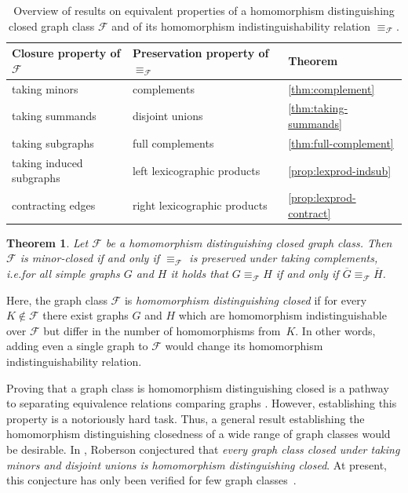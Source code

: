 \documentclass[3p,final]{elsarticle}
\newtheorem{theorem}{Theorem}
\begin{document}
	\begin{table}
		\centering
		\begin{tabular}{| l l l |}
			\hline
			\textbf{Closure property of $\mathcal{F}$} & \textbf{Preservation property of $\equiv_{\mathcal{F}}$} & \textbf{Theorem}\\ \hline
			taking minors   & complements      & \cref{thm:complement} \\  
			taking summands & disjoint unions   & \cref{thm:taking-summands} \\
			taking subgraphs& full complements & \cref{thm:full-complement} \\
			taking induced subgraphs & left lexicographic products  & \cref{prop:lexprod-indsub} \\ 
			contracting edges & right lexicographic products & \cref{prop:lexprod-contract} \\
			\hline
		\end{tabular}
		
		\caption{Overview of results on equivalent properties of a homomorphism distinguishing closed graph class $\mathcal{F}$ and of its homomorphism indistinguishability relation $\equiv_{\mathcal{F}}$.}
		\label{tab:overview}
	\end{table}
	
	\begin{theorem} \label{thm:main2}
		Let $\mathcal{F}$ be a homomorphism distinguishing closed graph class.
		Then $\mathcal{F}$ is minor-closed if and only if $\equiv_{\mathcal{F}}$ is preserved under taking complements, i.e.\@ for all simple graphs $G$ and $H$ it holds that $G \equiv_{\mathcal{F}} H$ if and only if $\overline{G} \equiv_{\mathcal{F}} \overline{H}$.
	\end{theorem}
	
	Here, the graph class $\mathcal{F}$ is \emph{homomorphism distinguishing closed} \cite{roberson_oddomorphisms_2022} if for every $K \not\in \mathcal{F}$ there exist graphs $G$ and $H$ which are homomorphism indistinguishable over $\mathcal{F}$ but differ in the number of homomorphisms from~$K$. In other words, adding even a single graph to $\mathcal{F}$ would change its homomorphism indistinguishability relation.
	
	Proving that a graph class is homomorphism distinguishing closed is a pathway to separating equivalence relations comparing graphs \cite{roberson_lasserre_2023}.
	However, establishing this property is a notoriously hard task.
	Thus, a general result establishing the homomorphism distinguishing closedness of a wide range of graph classes would be desirable.
	In \cite{roberson_oddomorphisms_2022}, Roberson conjectured that \emph{every graph class closed under taking minors and disjoint unions is homomorphism distinguishing closed}.
	At present, this conjecture has only been  verified for few graph classes~\cite{roberson_oddomorphisms_2022,neuen_homomorphism-distinguishing_2023}.
	
\end{document}
